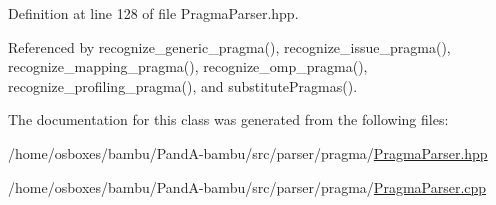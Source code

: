 Definition at line 128 of file Pragma\+Parser.\+hpp.



Referenced by recognize\+\_\+generic\+\_\+pragma(), recognize\+\_\+issue\+\_\+pragma(), recognize\+\_\+mapping\+\_\+pragma(), recognize\+\_\+omp\+\_\+pragma(), recognize\+\_\+profiling\+\_\+pragma(), and substitute\+Pragmas().



The documentation for this class was generated from the following files\+:\begin{DoxyCompactItemize}
\item 
/home/osboxes/bambu/\+Pand\+A-\/bambu/src/parser/pragma/\hyperlink{PragmaParser_8hpp}{Pragma\+Parser.\+hpp}\item 
/home/osboxes/bambu/\+Pand\+A-\/bambu/src/parser/pragma/\hyperlink{PragmaParser_8cpp}{Pragma\+Parser.\+cpp}\end{DoxyCompactItemize}

